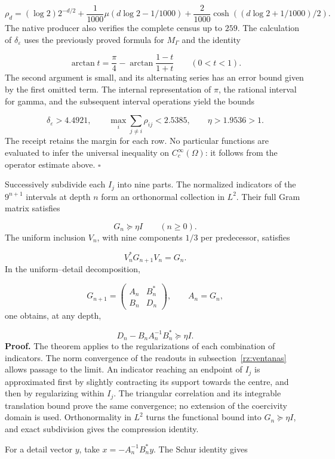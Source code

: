 \[
\rho_d=(\log2)2^{-d/2}
+\frac1{1000}\mu(d\log2-1/1000)
+\frac2{1000}\cosh((d\log2+1/1000)/2).
\]
The native producer also verifies the complete census up to \(259\). The calculation of \(\delta_\varepsilon\) uses the previously proved formula for \(M_\Gamma\) and the identity

\[
\arctan t=\frac\pi4-
\arctan\frac{1-t}{1+t}\qquad(0<t<1).
\]
The second argument is small, and its alternating series has an error bound given by the first omitted term. The internal representation of \(\pi\), the rational interval for gamma, and the subsequent interval operations yield the bounds

\[
\delta_\varepsilon>4.4921,\qquad
\max_i\sum_{j\neq i}\rho_{ij}<2.5385,\qquad
\eta>1.9536>1.
\]
The receipt retains the margin for each row. No particular functions are evaluated to infer the universal inequality on \(C_c^\infty(\Omega)\): it follows from the operator estimate above. \hfill\(\square\)

Successively subdivide each \(I_j\) into nine parts. The normalized indicators of the \(9^{n+1}\) intervals at depth \(n\) form an orthonormal collection in \(L^2\). Their full Gram matrix satisfies

\[
G_n\succeq\eta I\qquad(n\geq0).
\]
The uniform inclusion \(V_n\), with nine components \(1/3\) per predecessor, satisfies

\[
V_n^*G_{n+1}V_n=G_n.
\]
In the uniform–detail decomposition,

\[
G_{n+1}=\begin{pmatrix}A_n&B_n^*\\B_n&D_n\end{pmatrix},
\qquad A_n=G_n,
\]
one obtains, at any depth,

\[
\boxed{D_n-B_nA_n^{-1}B_n^*\succeq\eta I.}
\]
\textbf{Proof.} The theorem applies to the regularizations of each combination of indicators. The norm convergence of the readouts in subsection~\ref{rz:ventanas} allows passage to the limit. An indicator reaching an endpoint of \(I_j\) is approximated first by slightly contracting its support towards the centre, and then by regularizing within \(I_j\). The triangular correlation and its integrable translation bound prove the same convergence; no extension of the coercivity domain is used. Orthonormality in \(L^2\) turns the functional bound into \(G_n\succeq\eta I\), and exact subdivision gives the compression identity.

For a detail vector \(y\), take \(x=-A_n^{-1}B_n^*y\). The Schur identity gives

